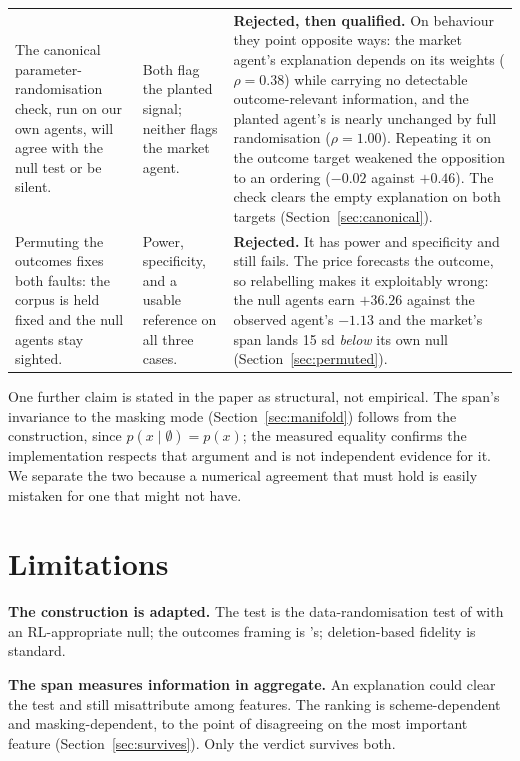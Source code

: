 \documentclass[10pt,twocolumn]{article}
\newcommand{\elsewhere}[1]{Section~\ref{#1}}
\begin{document}
\begin{table}[!tp]
\begin{tabular}{p{}p{}p{}}
\addlinespace
The canonical parameter-randomisation check, run on our own agents, will agree
with the null test or be silent. &
Both flag the planted signal; neither flags the market agent. &
\textbf{Rejected, then qualified.} On behaviour they point opposite ways: the
market agent's explanation depends on its weights ($\rho=0.38$) while carrying
no detectable outcome-relevant information, and the planted agent's is nearly
unchanged by full randomisation ($\rho=1.00$). Repeating it on the outcome
target weakened the opposition to an ordering ($-0.02$ against $+0.46$). The
check clears the empty explanation on both targets
(Section~\ref{sec:canonical}). \\
\addlinespace
Permuting the outcomes fixes both faults: the corpus is held fixed and the null
agents stay sighted. &
Power, specificity, and a usable reference on all three cases. &
\textbf{Rejected.} It has power and specificity and still fails. The price
forecasts the outcome, so relabelling makes it exploitably wrong: the null
agents earn $+36.26$ against the observed agent's $-1.13$ and the market's span
lands 15 sd \emph{below} its own null (Section~\ref{sec:permuted}). \\
\bottomrule
\end{tabular}
\end{table}

One further claim is stated in the paper as structural, not empirical.
The span's invariance to the masking mode (Section~\ref{sec:manifold}) follows
from the construction, since $p(x \mid \emptyset) = p(x)$; the measured equality
confirms the implementation respects that argument and is not independent
evidence for it. We separate the two because a numerical agreement that must
hold is easily mistaken for one that might not have.

\section{Limitations}

\textbf{The construction is adapted.} The test is the data-randomisation test of
\citet{adebayo2018sanity} with an RL-appropriate null; the outcomes framing is
\citet{beechey2023sverl}'s; deletion-based fidelity is standard.

\textbf{The span measures information in aggregate.} An explanation could clear
the test and still misattribute among features. The ranking is
scheme-dependent and masking-dependent, to the point of disagreeing on the most
important feature (\elsewhere{sec:survives}). Only the verdict survives both.
\end{document}
